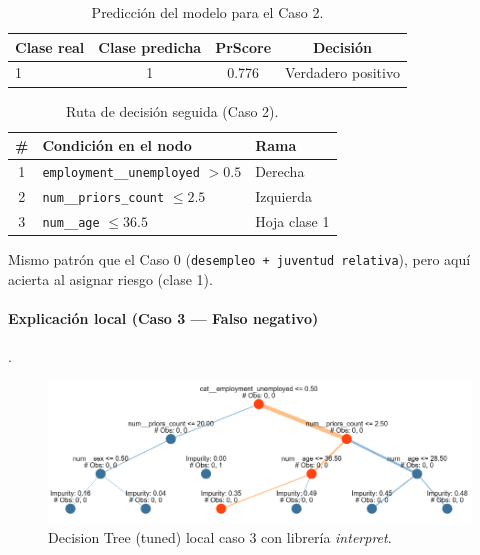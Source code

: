 \begin{table}[H]
\centering
\caption{Predicción del modelo para el Caso 2.}
\label{tab:local-pred-caso2}
\small
\begin{tabular}{@{}lccc@{}}
\toprule
\textbf{Clase real} & \textbf{Clase predicha} & \textbf{PrScore} & \textbf{Decisión} \\
\midrule
1 & 1 & 0.776 & Verdadero positivo \\
\bottomrule
\end{tabular}
\end{table}

\begin{table}[H]
\centering
\caption{Ruta de decisión seguida (Caso 2).}
\label{tab:local-path-caso2}
\small
\begin{tabular}{@{}cll@{}}
\toprule
\# & \textbf{Condición en el nodo} & \textbf{Rama} \\
\midrule
1 & \texttt{employment\_\_unemployed} \(> 0.5\) & Derecha \\
2 & \texttt{num\_\_priors\_count} \(\le 2.5\)   & Izquierda \\
3 & \texttt{num\_\_age} \(\le 36.5\)            & Hoja clase 1 \\
\bottomrule
\end{tabular}
\end{table}

Mismo patrón que el Caso 0 (\texttt{desempleo + juventud relativa}), pero aquí acierta al asignar riesgo (clase 1).

\paragraph{Explicación local (Caso 3 — Falso negativo)}.

\begin{figure}[h!]
  \centering
  \includegraphics[width=0.92\linewidth]{figures/decision_tree_tunned_depth_local2.png}
  \caption{Decision Tree (tuned) local caso 3 con librería \textit{interpret}.}
  \label{fig:tree-tuned_local3}
\end{figure}

